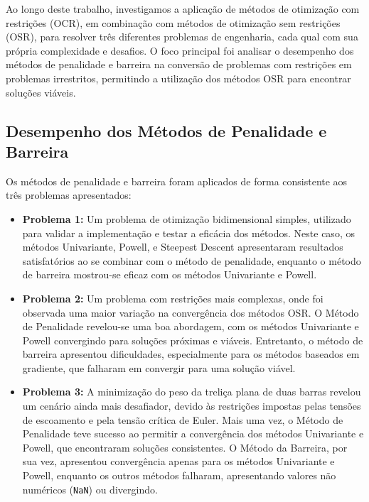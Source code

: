 \documentclass[a4paper, 12pt]{article}
\begin{document}
Ao longo deste trabalho, investigamos a aplicação de métodos de otimização com restrições (OCR), em combinação com métodos de otimização sem restrições (OSR), para resolver três diferentes problemas de engenharia, cada qual com sua própria complexidade e desafios. O foco principal foi analisar o desempenho dos métodos de penalidade e barreira na conversão de problemas com restrições em problemas irrestritos, permitindo a utilização dos métodos OSR para encontrar soluções viáveis.

\subsection{Desempenho dos Métodos de Penalidade e Barreira}

Os métodos de penalidade e barreira foram aplicados de forma consistente aos três problemas apresentados:

\begin{itemize}
    \item \textbf{Problema 1:} Um problema de otimização bidimensional simples, utilizado para validar a implementação e testar a eficácia dos métodos. Neste caso, os métodos Univariante, Powell, e Steepest Descent apresentaram resultados satisfatórios ao se combinar com o método de penalidade, enquanto o método de barreira mostrou-se eficaz com os métodos Univariante e Powell.

    \item \textbf{Problema 2:} Um problema com restrições mais complexas, onde foi observada uma maior variação na convergência dos métodos OSR. O Método de Penalidade revelou-se uma boa abordagem, com os métodos Univariante e Powell convergindo para soluções próximas e viáveis. Entretanto, o método de barreira apresentou dificuldades, especialmente para os métodos baseados em gradiente, que falharam em convergir para uma solução viável.

    \item \textbf{Problema 3:} A minimização do peso da treliça plana de duas barras revelou um cenário ainda mais desafiador, devido às restrições impostas pelas tensões de escoamento e pela tensão crítica de Euler. Mais uma vez, o Método de Penalidade teve sucesso ao permitir a convergência dos métodos Univariante e Powell, que encontraram soluções consistentes. O Método da Barreira, por sua vez, apresentou convergência apenas para os métodos Univariante e Powell, enquanto os outros métodos falharam, apresentando valores não numéricos (\texttt{NaN}) ou divergindo.

\end{itemize}
\end{document}
